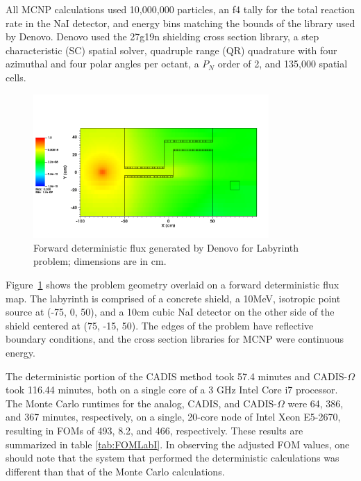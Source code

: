 \documentclass[12pt]{article}
\begin{document}
All MCNP calculations used 10,000,000 particles, an f4 tally for the total reaction rate in the NaI detector, and energy bins matching the bounds of the library used by Denovo. 
Denovo used the 27g19n shielding cross section library, a step characteristic (SC) spatial solver, quadruple range (QR) quadrature with four azimuthal and four polar angles per octant, a $P_N$ order of 2, and 135,000 spatial cells.%

\begin{figure}
  \begin{center}
    \includegraphics[width=0.80\textwidth]{./images/maze2_forward_group00_adjusted.png}
    \caption[]{\label{fig::fwdflux}Forward deterministic flux generated by Denovo for Labyrinth problem; dimensions are in cm.}
  \end{center}
\end{figure}
Figure~\ref{fig::fwdflux} shows the problem geometry overlaid on a forward deterministic flux map. The labyrinth is comprised of a concrete shield, a 10MeV, isotropic point source at (-75, 0, 50), and a 10cm cubic NaI detector on the other side of the shield centered at (75, -15, 50). The edges of the problem have reflective boundary conditions, and the cross section libraries for MCNP were continuous energy. 

The deterministic portion of the CADIS method took 57.4 minutes and CADIS-$\Omega$ took 116.44 minutes, both on a single core of a 3 GHz Intel Core i7 processor. The Monte Carlo runtimes for the analog, CADIS, and CADIS-$\Omega$ were 64, 386, and 367 minutes, respectively, on a single, 20-core node of Intel Xeon E5-2670, resulting in FOMs of 493, 8.2, and 466, respectively. These results are summarized in table \ref{tab:FOMLabI}. In observing the adjusted FOM values, one should note that the system that performed the deterministic calculations was different than that of the Monte Carlo calculations. 
\end{document}
